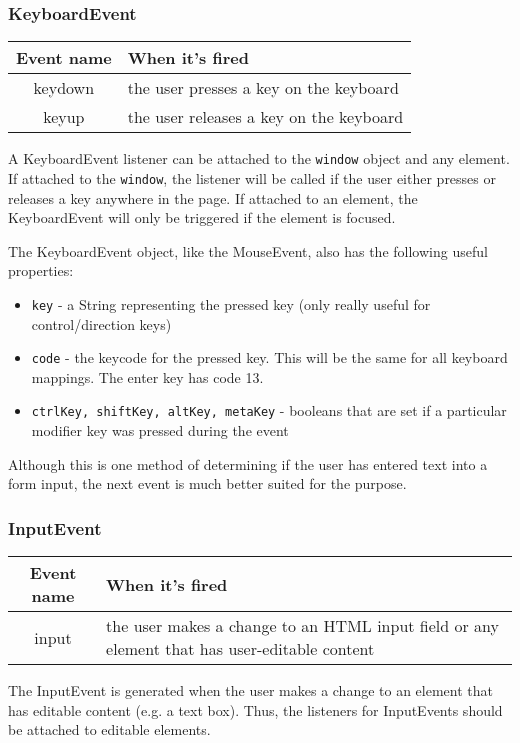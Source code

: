\documentclass[12pt]{article}
\renewcommand{\tt}[1]{\texttt{#1}}
\begin{document}
\subsubsection*{KeyboardEvent}
\begin{center}
  \begin{tabular}{| c | p{10.4cm} |}
    \hline
    \textbf{Event name} & \textbf{When it's fired} \\
    \hline
    keydown & the user presses a key on the keyboard \\
    \hline
    keyup & the user releases a key on the keyboard \\
    \hline
  \end{tabular}
\end{center}
A KeyboardEvent listener can be attached to the \texttt{window} object and any element. If attached to the \texttt{window}, the listener will be called if the user either presses or releases a key anywhere in the page. If attached to an element, the KeyboardEvent will only be triggered if the element is focused.
\par
The KeyboardEvent object, like the MouseEvent, also has the following useful properties:
\begin{itemize}
\item \tt{key} - a String representing the pressed key (only really useful for control/direction keys)
\item \tt{code} - the keycode for the pressed key. This will be the same for all keyboard mappings. The enter key has code 13.
\item \tt{ctrlKey, shiftKey, altKey, metaKey} - booleans that are set if a particular modifier key was pressed during the event
\end{itemize}
\par
Although this is one method of determining if the user has entered text into a form input, the next event is much better suited for the purpose.
\subsubsection*{InputEvent}
\begin{center}
  \begin{tabular}{| c | p{10.4cm} |}
    \hline
    \textbf{Event name} & \textbf{When it's fired} \\
    \hline
    input & the user makes a change to an HTML input field
            or any element that has user-editable content \\
    \hline
  \end{tabular}
\end{center}
The InputEvent is generated when the user makes a change to an element that has editable content (e.g. a text box). Thus, the listeners for InputEvents should be attached to editable elements.
\end{document}

